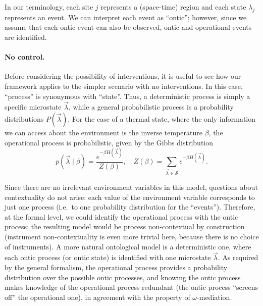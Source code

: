 \documentclass[a4paper,onecolumn,11pt,accepted=2018-05-04]{quantumarticle}
\begin{document}
In our terminology, each site $j$ represents a (space-time) region and each state $\lambda_j$ represents an event. We can interpret each event as ``ontic''; however, since we assume that each ontic event can also be observed, ontic and operational events are identified.

\paragraph*{No control.}
Before considering the possibility of interventions, it is useful to see how our framework applies to the simpler scenario with no interventions. In this case, ``process'' is synonymous with ``state''. Thus, a deterministic process is simply a specific microstate $\vec{\lambda}$, while a general probabilistic process is a probability distributions $P\left(\vec{\lambda}\right)$. For the case of a thermal state, where the only information we can access about the environment is the inverse temperature $\beta$, the operational process is probabilistic, given by the Gibbs distribution
\begin{equation}
p(\vec{\lambda}\mid \beta) = \frac{e^{-\beta H\left(\vec{\lambda}\right)}}{Z(\beta)},\quad  Z(\beta) = \!\!\sum_{\vec{\lambda}\in\mathcal{S}} e^{-\beta H\left(\vec{\lambda}\right)}.
\label{Gibbs}
\end{equation}

Since there are no irrelevant environment variables in this model, questions about contextuality do not arise: each value of the environment variable corresponds to just one process (i.e.\ to one probability distribution for the ``events''). Therefore, at the formal level, we could identify the operational process with the ontic process; the resulting model would be process non-contextual by construction (instrument non-contextuality is even more trivial here, because there is no choice of instruments). A more natural ontological model is a deterministic one, where each ontic process (or ontic state) is identified with one microstate $\vec{\lambda}$. As required by the general formalism, the operational process provides a probability distribution over the possible ontic processes, and knowing the ontic process makes knowledge of the operational process redundant (the ontic process ``screens off'' the operational one), in agreement with the property of $\omega$-mediation.
\end{document}
